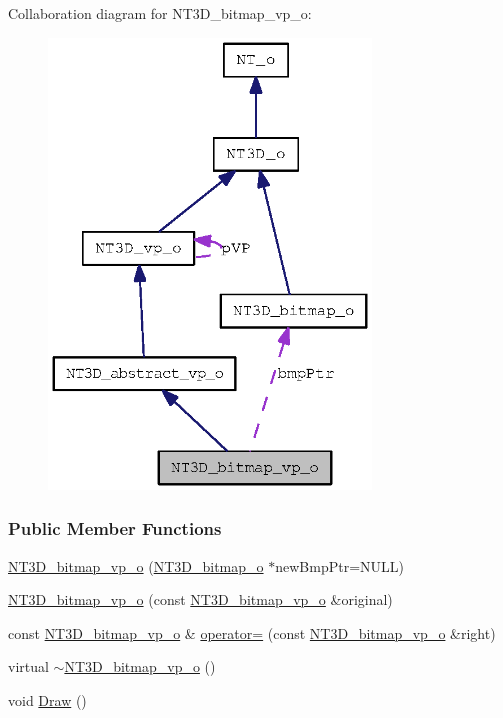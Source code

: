 Collaboration diagram for NT3D\_\-bitmap\_\-vp\_\-o:
\nopagebreak
\begin{figure}[H]
\begin{center}
\leavevmode
\includegraphics[width=243pt]{class_n_t3_d__bitmap__vp__o__coll__graph}
\end{center}
\end{figure}
\subsubsection*{Public Member Functions}
\begin{DoxyCompactItemize}
\item 
\hyperlink{class_n_t3_d__bitmap__vp__o_ae7045cb5c8774d499282c8378504bf31}{NT3D\_\-bitmap\_\-vp\_\-o} (\hyperlink{class_n_t3_d__bitmap__o}{NT3D\_\-bitmap\_\-o} $\ast$newBmpPtr=NULL)
\item 
\hyperlink{class_n_t3_d__bitmap__vp__o_ab38d3e5dbefc60e6ea36bc69184745f1}{NT3D\_\-bitmap\_\-vp\_\-o} (const \hyperlink{class_n_t3_d__bitmap__vp__o}{NT3D\_\-bitmap\_\-vp\_\-o} \&original)
\item 
const \hyperlink{class_n_t3_d__bitmap__vp__o}{NT3D\_\-bitmap\_\-vp\_\-o} \& \hyperlink{class_n_t3_d__bitmap__vp__o_a2d885066e12eaeb87673675e11c7d871}{operator=} (const \hyperlink{class_n_t3_d__bitmap__vp__o}{NT3D\_\-bitmap\_\-vp\_\-o} \&right)
\item 
virtual \hyperlink{class_n_t3_d__bitmap__vp__o_a9b8615c4635449785025206d9c6e4651}{$\sim$NT3D\_\-bitmap\_\-vp\_\-o} ()
\item 
void \hyperlink{class_n_t3_d__bitmap__vp__o_a18da5d4f0308c64f40ed843a09a09691}{Draw} ()
\end{DoxyCompactItemize}
